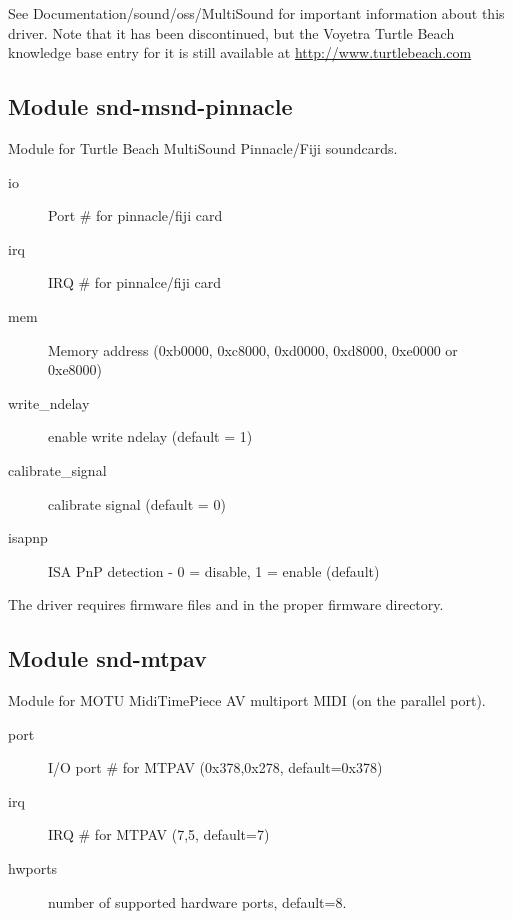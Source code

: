 \documentclass[a4paper,8pt,english]{sphinxmanual}
\begin{document}
See Documentation/sound/oss/MultiSound for important information
about this driver.  Note that it has been discontinued, but the
Voyetra Turtle Beach knowledge base entry for it is still available
at
\href{http://www.turtlebeach.com}{http://www.turtlebeach.com}


\subsection{Module snd-msnd-pinnacle}
\label{sound/alsa-configuration:module-snd-msnd-pinnacle}
Module for Turtle Beach MultiSound Pinnacle/Fiji soundcards.
\begin{description}
\item[{io}] \leavevmode
Port \# for pinnacle/fiji card

\item[{irq}] \leavevmode
IRQ \# for pinnalce/fiji card

\item[{mem}] \leavevmode
Memory address (0xb0000, 0xc8000, 0xd0000, 0xd8000, 0xe0000 or 0xe8000)

\item[{write\_ndelay}] \leavevmode
enable write ndelay (default = 1)

\item[{calibrate\_signal}] \leavevmode
calibrate signal (default = 0)

\item[{isapnp}] \leavevmode
ISA PnP detection - 0 = disable, 1 = enable (default)

\end{description}

The driver requires firmware files  and
 in the proper firmware directory.


\subsection{Module snd-mtpav}
\label{sound/alsa-configuration:module-snd-mtpav}
Module for MOTU MidiTimePiece AV multiport MIDI (on the parallel
port).
\begin{description}
\item[{port}] \leavevmode
I/O port \# for MTPAV (0x378,0x278, default=0x378)

\item[{irq}] \leavevmode
IRQ \# for MTPAV (7,5, default=7)

\item[{hwports}] \leavevmode
number of supported hardware ports, default=8.

\end{description}
\end{document}

